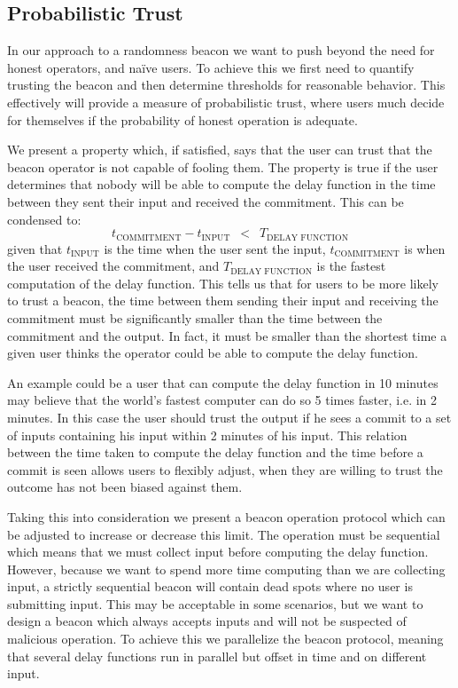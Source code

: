 \subsection{Probabilistic Trust}%
\label{sub:probabilistic_trust}
In our approach to a randomness beacon we want to push beyond the need for honest operators, and naïve users.
To achieve this we first need to quantify trusting the beacon and then determine thresholds for reasonable behavior.
This effectively will provide a measure of probabilistic trust, where users much decide for themselves if the probability of honest operation is adequate.

We present a property which, if satisfied, says that the user can trust that the beacon operator is not capable of fooling them.
The property is true if the user determines that nobody will be able to compute the delay function in the time between they sent their input and received the commitment.
This can be condensed to:
\begin{equation*}
    t_\text{COMMITMENT} - t_\text{INPUT}\enspace <\enspace T_\text{DELAY FUNCTION}
\end{equation*}
given that $t_\text{INPUT}$ is the time when the user sent the input, $t_\text{COMMITMENT}$ is when the user received the commitment, and $T_\text{DELAY FUNCTION}$ is the fastest computation of the delay function.
This tells us that for users to be more likely to trust a beacon, the time between them sending their input and receiving the commitment must be significantly smaller than the time between the commitment and the output.
In fact, it must be smaller than the shortest time a given user thinks the operator could be able to compute the delay function.

An example could be a user that can compute the delay function in 10 minutes may believe that the world's fastest computer can do so 5 times faster, i.e. in 2 minutes. In this case the user should trust the output if he sees a commit to a set of inputs containing his input within 2 minutes of his input.
This relation between the time taken to compute the delay function and the time before a commit is seen allows users to flexibly adjust, when they are willing to trust the outcome has not been biased against them.

Taking this into consideration we present a beacon operation protocol which can be adjusted to increase or decrease this limit.
The operation must be sequential which means that we must collect input before computing the delay function.
However, because we want to spend more time computing than we are collecting input, a strictly sequential beacon will contain dead spots where no user is submitting input.
This may be acceptable in some scenarios, but we want to design a beacon which always accepts inputs and will not be suspected of malicious operation.
To achieve this we parallelize the beacon protocol, meaning that several delay functions run in parallel but offset in time and on different input.

